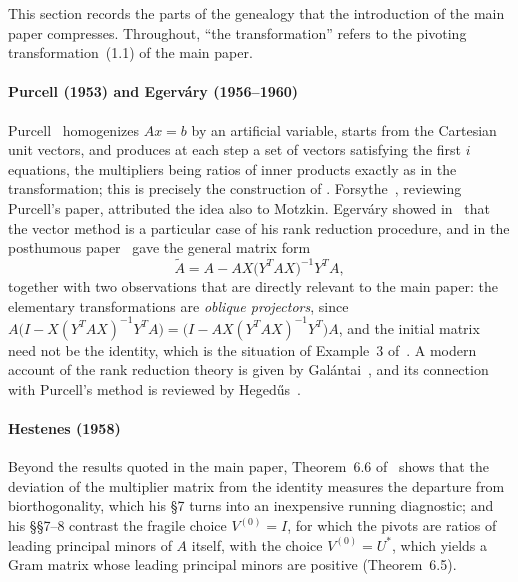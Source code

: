 \documentclass[supplement,review,onefignum,onetabnum]{siamart251216}
\begin{document}
This section records the parts of the genealogy that the introduction of the main
paper compresses. Throughout, ``the transformation'' refers to the pivoting
transformation~(1.1) of the main paper.

\paragraph{Purcell (1953) and Egerv\'ary (1956--1960)}
Purcell~\cite{Purcell1953} homogenizes $Ax=b$ by an artificial variable, starts
from the Cartesian unit vectors, and produces at each step a set of vectors
satisfying the first $i$ equations, the multipliers being ratios of inner
products exactly as in the transformation; this is precisely the construction of
\cite[\S5.9]{CastilloCJPC2000}. Forsythe~\cite{Forsythe1954}, reviewing
Purcell's paper, attributed the idea also to Motzkin. Egerv\'ary showed
in~\cite{Egervary1957} that the vector method is a particular case of his rank
reduction procedure, and in the posthumous paper~\cite{Egervary1960} gave the
general matrix form
%
\begin{equation}\label{eq:sm-rank-reduction}
\widetilde A = A - A X \bigl(Y^T A X\bigr)^{-1} Y^T A ,
\end{equation}
%
together with two observations that are directly relevant to the main paper:
the elementary transformations are \emph{oblique projectors}, since
$A\bigl(I - X(Y^TAX)^{-1}Y^TA\bigr) = \bigl(I - AX(Y^TAX)^{-1}Y^T\bigr)A$, and
the initial matrix need not be the identity, which is the situation of
Example~3 of~\cite{CastilloCJPC2000}. A modern account of the rank reduction
theory is given by Gal\'antai~\cite{Galantai2009,Galantai2001}, and its
connection with Purcell's method is reviewed by
Heged\H{u}s~\cite{Hegedus2010}.

\paragraph{Hestenes (1958)}
Beyond the results quoted in the main paper, Theorem~6.6
of~\cite{Hestenes1958} shows that the deviation of the multiplier matrix from
the identity measures the departure from biorthogonality, which his \S7 turns
into an inexpensive running diagnostic; and his \S\S7--8 contrast the fragile
choice $V^{(0)}=I$, for which the pivots are ratios of leading principal minors
of $A$ itself, with the choice $V^{(0)}=U^*$, which yields a Gram matrix whose
leading principal minors are positive (Theorem~6.5).
\end{document}
